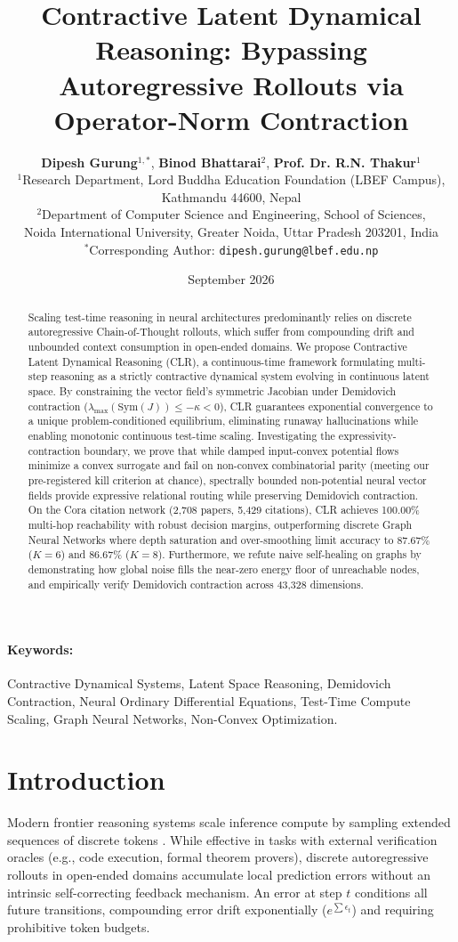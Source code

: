\documentclass[11pt,a4paper]{article}
\title{\textbf{Contractive Latent Dynamical Reasoning: Bypassing Autoregressive Rollouts via Operator-Norm Contraction}}
\author{
  \textbf{Dipesh Gurung}$^{1,*}$, \textbf{Binod Bhattarai}$^{2}$, \textbf{Prof. Dr. R.N. Thakur}$^{1}$ \\
  $^{1}$Research Department, Lord Buddha Education Foundation (LBEF Campus), Kathmandu 44600, Nepal \\
  $^{2}$Department of Computer Science and Engineering, School of Sciences, \\ Noida International University, Greater Noida, Uttar Pradesh 203201, India \\
  $^*$Corresponding Author: \texttt{dipesh.gurung@lbef.edu.np}
}
\date{September 2026}
\begin{document}
\maketitle

\begin{abstract}
Scaling test-time reasoning in neural architectures predominantly relies on discrete autoregressive Chain-of-Thought rollouts, which suffer from compounding drift and unbounded context consumption in open-ended domains. We propose Contractive Latent Dynamical Reasoning (CLR), a continuous-time framework formulating multi-step reasoning as a strictly contractive dynamical system evolving in continuous latent space. By constraining the vector field's symmetric Jacobian under Demidovich contraction ($\lambda_{\max}(\text{Sym}(J)) \le -\kappa < 0$), CLR guarantees exponential convergence to a unique problem-conditioned equilibrium, eliminating runaway hallucinations while enabling monotonic continuous test-time scaling. Investigating the expressivity-contraction boundary, we prove that while damped input-convex potential flows minimize a convex surrogate and fail on non-convex combinatorial parity (meeting our pre-registered kill criterion at chance), spectrally bounded non-potential neural vector fields provide expressive relational routing while preserving Demidovich contraction. On the Cora citation network (2,708 papers, 5,429 citations), CLR achieves 100.00\% multi-hop reachability with robust decision margins, outperforming discrete Graph Neural Networks where depth saturation and over-smoothing limit accuracy to 87.67\% ($K=6$) and 86.67\% ($K=8$). Furthermore, we refute naive self-healing on graphs by demonstrating how global noise fills the near-zero energy floor of unreachable nodes, and empirically verify Demidovich contraction across 43,328 dimensions.
\end{abstract}

\paragraph{Keywords:} Contractive Dynamical Systems, Latent Space Reasoning, Demidovich Contraction, Neural Ordinary Differential Equations, Test-Time Compute Scaling, Graph Neural Networks, Non-Convex Optimization.

\section{Introduction}

Modern frontier reasoning systems scale inference compute by sampling extended sequences of discrete tokens \citep{wei2022chain}. While effective in tasks with external verification oracles (e.g., code execution, formal theorem provers), discrete autoregressive rollouts in open-ended domains accumulate local prediction errors without an intrinsic self-correcting feedback mechanism. An error at step $t$ conditions all future transitions, compounding error drift exponentially ($e^{\sum \epsilon_t}$) and requiring prohibitive token budgets.
\end{document}
